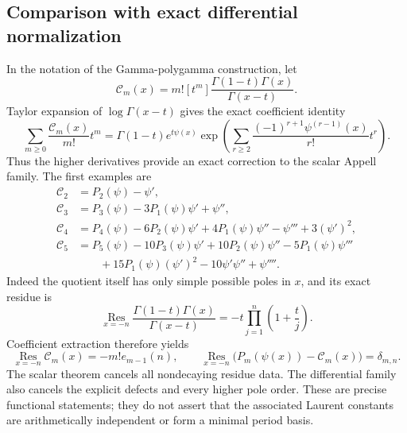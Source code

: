 \documentclass[11pt,a4paper]{article}
\numberwithin{equation}{section}
\theoremstyle{definition}
\begin{document}
\subsection{Comparison with exact differential normalization}

In the notation of the Gamma-polygamma construction, let
\begin{equation}
 \mathcal C_m(x)=m![t^m]\frac{\Gamma(1-t)\Gamma(x)}{\Gamma(x-t)}.
 \label{eq:scalar-differential-comparison-definition}
\end{equation}
Taylor expansion of $\log\Gamma(x-t)$ gives the exact
coefficient identity
\begin{equation}
 \sum_{m\geq0}\frac{\mathcal C_m(x)}{m!}t^m
 =\Gamma(1-t)e^{t\psi(x)}
  \exp\left(\sum_{r\geq2}
       \frac{(-1)^{r+1}\psi^{(r-1)}(x)}{r!}t^r\right).
 \label{eq:scalar-differential-comparison-generator}
\end{equation}
Thus the higher derivatives provide an exact correction to the
scalar Appell family.  The first examples are
\begin{equation}
 \begin{aligned}
 \mathcal C_2&=P_2(\psi)-\psi',\\
 \mathcal C_3&=P_3(\psi)-3P_1(\psi)\psi'+\psi'',\\
 \mathcal C_4&=P_4(\psi)-6P_2(\psi)\psi'+4P_1(\psi)\psi''
                  -\psi'''+3(\psi')^2,\\
 \mathcal C_5&=P_5(\psi)-10P_3(\psi)\psi'
                   +10P_2(\psi)\psi''-5P_1(\psi)\psi'''\\
 &\qquad+15P_1(\psi)(\psi')^2-10\psi'\psi''+\psi''''.
 \end{aligned}
 \label{eq:scalar-differential-comparison-examples}
\end{equation}
Indeed the quotient itself has only simple possible poles in $x$,
and its exact residue is
\begin{equation}
 \operatorname*{Res}_{x=-n}
    \frac{\Gamma(1-t)\Gamma(x)}{\Gamma(x-t)}
       =-t\prod_{j=1}^{n}\left(1+\frac{t}{j}\right).
 \label{eq:scalar-differential-exact-residue}
\end{equation}
Coefficient extraction therefore yields
\begin{equation}
 \operatorname*{Res}_{x=-n} \mathcal C_m(x)=-m!e_{m-1}(n),
 \qquad
 \operatorname*{Res}_{x=-n}\bigl(P_m(\psi(x))-\mathcal C_m(x)\bigr)
          =\delta_{m,n}.
 \label{eq:scalar-exact-defect-comparison}
\end{equation}
The scalar theorem cancels all nondecaying residue data.  The
differential family also cancels the explicit defects and every
higher pole order.  These are precise functional statements;
they do not assert that the associated Laurent constants are
arithmetically independent or form a minimal period basis.
\end{document}
